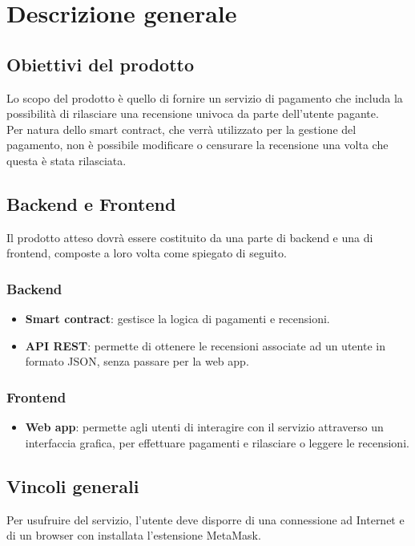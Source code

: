 \section{Descrizione generale}

    \subsection{Obiettivi del prodotto}
    Lo scopo del prodotto è quello di fornire un servizio di pagamento che includa la possibilità di rilasciare una recensione univoca da parte dell'utente pagante. \\
    Per natura dello smart contract, che verrà utilizzato per la gestione del pagamento, non è possibile modificare o censurare la recensione una volta che questa è stata rilasciata.

    \subsection{Backend e Frontend}
    Il prodotto atteso dovrà essere costituito da una parte di backend e una di frontend, composte a loro volta come spiegato di seguito.

        \subsubsection{Backend}
        \begin{itemize}
            \item \textbf{Smart contract}: gestisce la logica di pagamenti e recensioni.
            \item \textbf{API REST}: permette di ottenere le recensioni associate ad un utente in formato JSON, senza passare per la web app.
        \end{itemize}

        \subsubsection{Frontend}
        \begin{itemize}
            \item \textbf{Web app}: permette agli utenti di interagire con il servizio attraverso un interfaccia grafica, per effettuare pagamenti e rilasciare o leggere le recensioni.
        \end{itemize}
    \subsection{Vincoli generali}
    Per usufruire del servizio, l'utente deve disporre di una connessione ad Internet e di un browser con installata l'estensione MetaMask.
